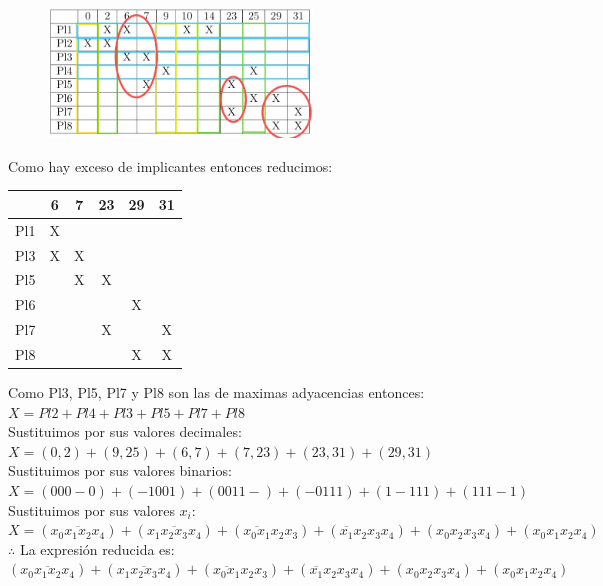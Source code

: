 \documentclass[a4paper,12pt]{article}
\begin{document}
\begin{enumerate}[label=\textcolor{teal}{\textbf{\arabic*.}}]
        \begin{figure}[H]
            \centering
            \includegraphics[width=7cm]{img/12.png}
        \end{figure}

        Como hay exceso de implicantes entonces reducimos:
        \begin{table} [H]
            \centering
            \begin{tabular}{|c|c|c|c|c|c|}
                \hline
                    & 6 & 7  & 23 & 29 & 31\\ \hline
                Pl1 & X &    &    &    &   \\ \hline 
                \rowcolor{yellow!50} Pl3 & X & X  &    &    &   \\ \hline 
                \rowcolor{yellow!50} Pl5 &  & X  &  X &    &   \\ \hline 
                Pl6 &  &    &    & X  &   \\ \hline 
                \rowcolor{yellow!50} Pl7 &  &    & X  &    & X \\ \hline 
                \rowcolor{yellow!50} Pl8 &  &    &    & X  & X \\ \hline 
            \end{tabular}
        \end{table}
        Como Pl3, Pl5, Pl7 y Pl8 son las de maximas adyacencias entonces:\\
        $X = Pl2 + Pl4 + Pl3 + Pl5 + Pl7 + Pl8$\\
        Sustituimos por sus valores decimales:\\
        $X = (0,2) + (9,25) + (6,7) + (7,23) + (23,31) + (29,31)$\\
        Sustituimos por sus valores binarios:\\
        $X = (000-0) + (-1001) + (0011-) + (-0111) + (1-111) + (111-1)$\\
        Sustituimos por sus valores $x_{i}$:\\
        $X = (\overline{x_0 x_1 x_2 x_4}) + (x_1 \overline{x_2 x_3} x_4) + (\overline{x_0 x_1} x_2 x_3) + (\overline{x_1} x_2 x_3 x_4) + (x_0 x_2 x_3 x_4) + (x_0 x_1 x_2 x_4)$\\
        $\therefore$ La expresión reducida es: \\
        $(\overline{x_0 x_1 x_2 x_4}) + (x_1 \overline{x_2 x_3} x_4) + (\overline{x_0 x_1} x_2 x_3) + (\overline{x_1} x_2 x_3 x_4) + (x_0 x_2 x_3 x_4) + (x_0 x_1 x_2 x_4)$\\


\end{enumerate}


\newpage
\nocite{*}
\printbibliography
\end{document}

